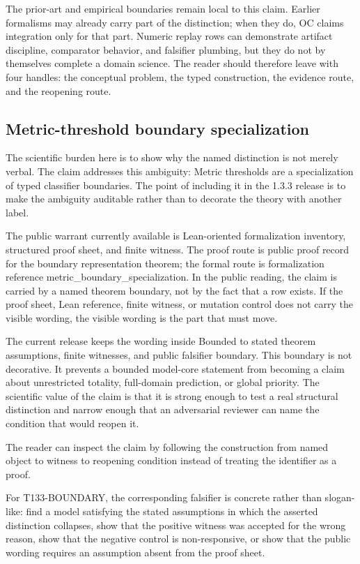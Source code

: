 The prior-art and empirical boundaries remain local to this claim. Earlier formalisms may already carry part of the distinction; when they do, OC claims integration only for that part. Numeric replay rows can demonstrate artifact discipline, comparator behavior, and falsifier plumbing, but they do not by themselves complete a domain science. The reader should therefore leave with four handles: the conceptual problem, the typed construction, the evidence route, and the reopening route.

\subsection{Metric-threshold boundary specialization}
The scientific burden here is to show why the named distinction is not merely verbal. The claim addresses this ambiguity: Metric thresholds are a specialization of typed classifier boundaries. The point of including it in the 1.3.3 release is to make the ambiguity auditable rather than to decorate the theory with another label.

The public warrant currently available is Lean-oriented formalization inventory, structured proof sheet, and finite witness. The proof route is public proof record for the boundary representation theorem; the formal route is formalization reference metric\_boundary\_specialization. In the public reading, the claim is carried by a named theorem boundary, not by the fact that a row exists. If the proof sheet, Lean reference, finite witness, or mutation control does not carry the visible wording, the visible wording is the part that must move.

The current release keeps the wording inside Bounded to stated theorem assumptions, finite witnesses, and public falsifier boundary. This boundary is not decorative. It prevents a bounded model-core statement from becoming a claim about unrestricted totality, full-domain prediction, or global priority. The scientific value of the claim is that it is strong enough to test a real structural distinction and narrow enough that an adversarial reviewer can name the condition that would reopen it.

The reader can inspect the claim by following the construction from named object to witness to reopening condition instead of treating the identifier as a proof.

For T133-BOUNDARY, the corresponding falsifier is concrete rather than slogan-like: find a model satisfying the stated assumptions in which the asserted distinction collapses, show that the positive witness was accepted for the wrong reason, show that the negative control is non-responsive, or show that the public wording requires an assumption absent from the proof sheet.


